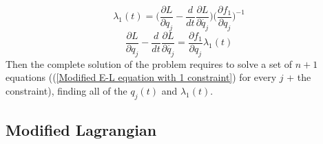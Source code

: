 \documentclass{article}
\begin{document}
\begin{equation*}
    \lambda_1(t) = \bigg( \frac{\partial L}{\partial {q_j}} -\frac{d}{dt}\frac{\partial L}{\partial \dot{q_j}} \bigg)\bigg(\frac{\partial f_1}{\partial q_j}  \bigg)^{-1}
\end{equation*}
\begin{equation}\label{Modified E-L equation with 1 constraint}
    \frac{\partial L}{\partial {q_j}} -\frac{d}{dt}\frac{\partial L}{\partial \dot{q_j}}=\frac{\partial f_1}{\partial q_j}\lambda_1(t)
\end{equation}
Then the complete solution of the problem requires to solve a set of $n+1$ equations ((\ref{Modified E-L equation with 1 constraint}) for every $j$ + the constraint), finding all of the $q_j(t)$ and $\lambda_1(t)$. 

\subsection{Modified Lagrangian}
\end{document}
